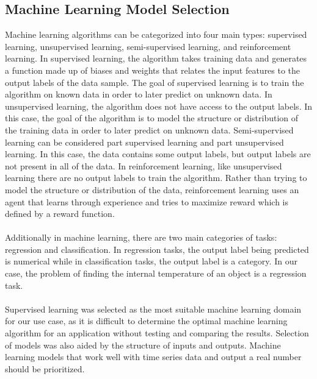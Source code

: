 \subsection{Machine Learning Model Selection}
Machine learning algorithms can be categorized into four main types: supervised learning, unsupervised learning, semi-supervised learning, and reinforcement learning. In supervised learning, the algorithm takes training data and generates a function made up of biases and weights that relates the input features to the output labels of the data sample. The goal of supervised learning is to train the algorithm on known data in order to later predict on unknown data. In unsupervised learning, the algorithm does not have access to the output labels. In this case, the goal of the algorithm is to model the structure or distribution of the training data in order to later predict on unknown data. Semi-supervised learning can be considered part supervised learning and part unsupervised learning. In this case, the data contains some output labels, but output labels are not present in all of the data. In reinforcement learning, like unsupervised learning there are no output labels to train the algorithm. Rather than trying to model the structure or distribution of the data, reinforcement learning uses an agent that learns through experience and tries to maximize reward which is defined by a reward function.\\\\

Additionally in machine learning, there are two main categories of tasks: regression and classification. In regression tasks, the output label being predicted is numerical while in classification tasks, the output label is a category. In our case, the problem of finding the internal temperature of an object is a regression task.\\\\
Supervised learning was selected as the most suitable machine learning domain for our use case, as it is difficult to determine the optimal machine learning algorithm for an application without testing and comparing the results. Selection of models was also aided by the structure of inputs and outputs. Machine learning models that work well with time series data and output a real number should be prioritized. %

